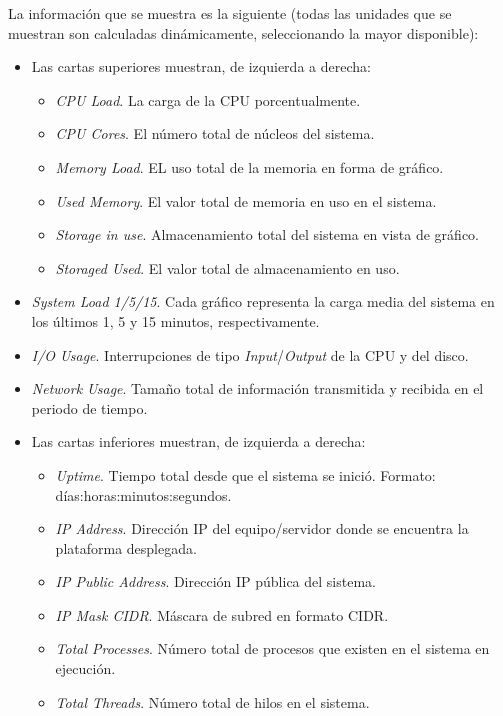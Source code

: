 La información que se muestra es la siguiente (todas las unidades que se muestran son calculadas dinámicamente, seleccionando la mayor disponible):
\begin{itemize}
\item Las cartas superiores muestran, de izquierda a derecha:
\begin{itemize}
	\item \textit{CPU Load}. La carga de la CPU porcentualmente.
	\item \textit{CPU Cores}. El número total de núcleos del sistema.
	\item \textit{Memory Load}. EL uso total de la memoria en forma de gráfico.
	\item \textit{Used Memory}. El valor total de memoria en uso en el sistema.
	\item \textit{Storage in use}. Almacenamiento total del sistema en vista de gráfico.
	\item \textit{Storaged Used}. El valor total de almacenamiento en uso.
\end{itemize}
\item \textit{System Load 1/5/15}. Cada gráfico representa la carga media del sistema en los últimos 1, 5 y 15 minutos, respectivamente.
\item \textit{I/O Usage}. Interrupciones de tipo \textit{Input}/\textit{Output} de la CPU y del disco.
\item \textit{Network Usage}. Tamaño total de información transmitida y recibida en el periodo de tiempo.
\item Las cartas inferiores muestran, de izquierda a derecha:
\begin{itemize}
	\item \textit{Uptime}. Tiempo total desde que el sistema se inició. Formato: días:horas:minutos:segundos.
	\item \textit{IP Address}. Dirección IP del equipo/servidor donde se encuentra la plataforma desplegada.
	\item \textit{IP Public Address}. Dirección IP pública del sistema.
	\item \textit{IP Mask CIDR}. Máscara de subred en formato CIDR.
	\item \textit{Total Processes}. Número total de procesos que existen en el sistema en ejecución.
	\item \textit{Total Threads}. Número total de hilos en el sistema.
\end{itemize}
\end{itemize}

